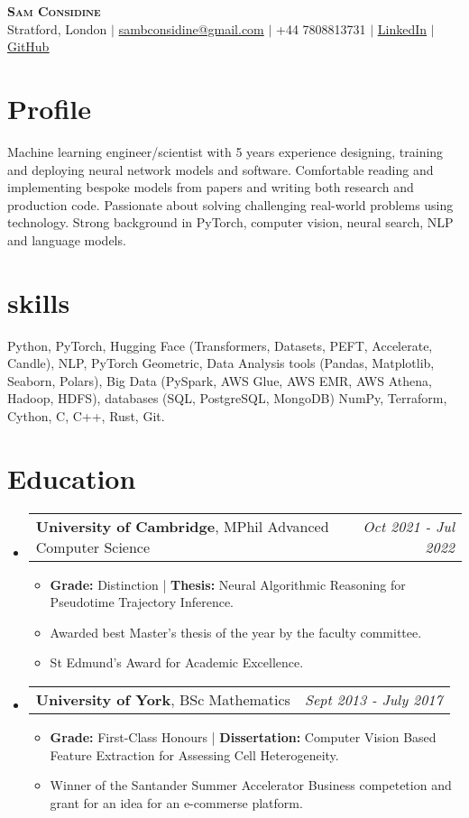 \documentclass[letterpaper,11pt]{article}
\makeatletter
\newcommand{\CVItem}[1]{
  \item{
    {#1 \vspace{0pt}}
  }
}
\newcommand{\CVSubHeading}[4]{
  \vspace{4pt}\item
    \begin{tabular*}{0.985\textwidth}[t]{l@{\extracolsep{\fill}}r}
      \textbf{#1}, {#3} & \textit{#4} \\
    \end{tabular*}\vspace{-3pt}
}
\newcommand{\CVSubHeadingListStart}{\begin{itemize}[leftmargin=0.15in, label={}]}
\newcommand{\CVSubHeadingListEnd}{\end{itemize}}
\newcommand{\CVItemListStart}{\begin{itemize}}
\newcommand{\CVItemListEnd}{\end{itemize}\vspace{-3pt}}
\makeatother
\begin{document}

\begin{center}
    \textbf{\Huge \scshape{Sam Considine}} \\ \vspace{8pt}
    \small Stratford, London $|$ 
    \href{mailto:sambconsidine@gmail.com}{sambconsidine@gmail.com} $|$
    +44 7808813731 $|$
    \href{https://uk.linkedin.com/in/samuel-considine-685249158}{\underline{LinkedIn}} $|$
    \href{https://github.com/samconsidine}{\underline{GitHub}} 
\end{center}

\vspace{0.3em}

\section{Profile}

Machine learning engineer/scientist with 5 years experience designing, training and deploying neural network models and software. Comfortable reading and implementing bespoke models from papers and writing both research and production code. Passionate about solving challenging real-world problems using technology. Strong background in PyTorch, computer vision, neural search, NLP and language models.

\section{skills}
Python, PyTorch, Hugging Face (Transformers, Datasets, PEFT, Accelerate, Candle), NLP, PyTorch Geometric, Data Analysis tools (Pandas, Matplotlib, Seaborn, Polars), Big Data (PySpark, AWS Glue, AWS EMR, AWS Athena, Hadoop, HDFS), databases (SQL, PostgreSQL, MongoDB) NumPy, Terraform, Cython, C, C++, Rust, Git.

\section{Education}

\CVSubHeadingListStart
    \CVSubHeading
      {University of Cambridge}{Cambridge, UK}
      {MPhil Advanced Computer Science}{Oct 2021 - Jul 2022}
      \CVItemListStart
        \CVItem{\textbf{Grade:} Distinction | \textbf{Thesis:} Neural Algorithmic Reasoning for Pseudotime Trajectory Inference.} 
        \CVItem{Awarded best Master's thesis of the year by the faculty committee.}
        \CVItem{St Edmund's Award for Academic Excellence.}
      \CVItemListEnd
      \vspace{-0.5em}
    \CVSubHeading
      {University of York}{York, UK}
      {BSc Mathematics}{Sept 2013 - July 2017}
      \CVItemListStart
        \CVItem{\textbf{Grade:} First-Class Honours | \textbf{Dissertation: } Computer Vision Based Feature Extraction for Assessing Cell Heterogeneity.}
        \CVItem{Winner of the Santander Summer Accelerator Business competetion and grant for an idea for an e-commerse platform.}
      \CVItemListEnd
\CVSubHeadingListEnd
\end{document}
